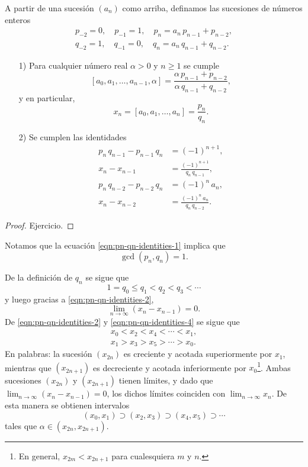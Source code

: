 \begin{lema}
  A partir de una sucesión $(a_n)$ como arriba, definamos las sucesiones de
  números enteros
  \begin{gather*}
    p_{-2} = 0, \quad p_{-1} = 1, \quad p_n = a_n \, p_{n-1} + p_{n-2}, \\
    q_{-2} = 1, \quad q_{-1} = 0, \quad q_n = a_n \, q_{n-1} + q_{n-2}.
  \end{gather*}

  \begin{enumerate}
  \item[1)] Para cualquier número real $\alpha > 0$ y $n \ge 1$ se cumple
    \begin{equation}
      \label{eqn:fraccion-finita-pn-qn}
        [a_0, a_1, \ldots, a_{n-1}, \alpha] = \frac{\alpha \, p_{n-1} + p_{n-2}}{\alpha \, q_{n-1} + q_{n-2}},
    \end{equation}
    y en particular,
    $$x_n = [a_0, a_1, \ldots, a_n] = \frac{p_n}{q_n}.$$

  \item[2)] Se cumplen las identidades
    \begin{align}
    \label{eqn:pn-qn-identities-1} p_n \, q_{n-1} - p_{n-1} \, q_n & = (-1)^{n+1},\\
    \label{eqn:pn-qn-identities-2} x_n - x_{n-1} & = \frac{(-1)^{n+1}}{q_n \, q_{n-1}},\\
    \label{eqn:pn-qn-identities-3} p_n \, q_{n-2} - p_{n-2} \, q_n & = (-1)^n \, a_n,\\
    \label{eqn:pn-qn-identities-4} x_n - x_{n-2} & = \frac{(-1)^n \, a_n}{q_n \, q_{n-2}}.
  \end{align}
  \end{enumerate}

  \begin{proof}
    Ejercicio.
  \end{proof}
\end{lema}

Notamos que la ecuación \eqref{eqn:pn-qn-identities-1} implica que
$$\gcd (p_n,q_n) = 1.$$

De la definición de $q_n$ se sigue que
$$1 = q_0 \le q_1 < q_2 < q_3 < \cdots$$
y luego gracias a \eqref{eqn:pn-qn-identities-2},
$$\lim_{n\to \infty} (x_n - x_{n-1}) = 0.$$
De \eqref{eqn:pn-qn-identities-2} y \eqref{eqn:pn-qn-identities-4} se sigue que
\begin{gather*}
  x_0 < x_2 < x_4 < \cdots < x_1,\\
  x_1 > x_3 > x_5 > \cdots > x_0.
\end{gather*}
En palabras: la sucesión $(x_{2n})$ es creciente y acotada superiormente por
$x_1$, mientras que $(x_{2n+1})$ es decreciente y acotada inferiormente por
$x_0$\footnote{En general, $x_{2m} < x_{2n+1}$ para cualesquiera $m$ y $n$.}.
Ambas sucesiones $(x_{2n})$ y $(x_{2n+1})$ tienen límites, y dado que
$\lim_{n\to \infty} (x_n - x_{n-1}) = 0$, los dichos límites coinciden con
$\lim_{n\to \infty} x_n$. De esta manera se obtienen intervalos
$$(x_0, x_1) \supset (x_2,x_3) \supset (x_4,x_5) \supset \cdots$$
tales que $\alpha \in (x_{2n}, x_{2n+1})$.


